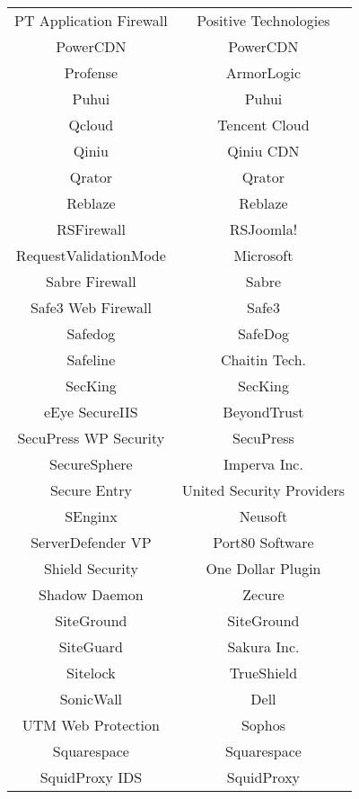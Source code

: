\begin{table}[h]
\begin{tabular}{|c | c |}
  PT Application Firewall         & Positive Technologies\\
  PowerCDN                        & PowerCDN\\
  Profense                        & ArmorLogic\\
  Puhui                           & Puhui\\
  Qcloud                          & Tencent Cloud\\
  Qiniu                           & Qiniu CDN\\
  Qrator                          & Qrator\\
  Reblaze                         & Reblaze\\
  RSFirewall                      & RSJoomla!\\
  RequestValidationMode           & Microsoft\\
  Sabre Firewall                  & Sabre\\
  Safe3 Web Firewall              & Safe3\\
  Safedog                         & SafeDog\\
  Safeline                        & Chaitin Tech.\\
  SecKing                         & SecKing\\
  eEye SecureIIS                  & BeyondTrust\\
  SecuPress WP Security           & SecuPress\\
  SecureSphere                    & Imperva Inc.\\
  Secure Entry                    & United Security Providers\\
  SEnginx                         & Neusoft\\
  ServerDefender VP               & Port80 Software\\
  Shield Security                 & One Dollar Plugin\\
  Shadow Daemon                   & Zecure\\
  SiteGround                      & SiteGround\\
  SiteGuard                       & Sakura Inc.\\
  Sitelock                        & TrueShield\\
  SonicWall                       & Dell\\
  UTM Web Protection              & Sophos\\
  Squarespace                     & Squarespace\\
  SquidProxy IDS                  & SquidProxy\\

\end{tabular}
\end{table}
